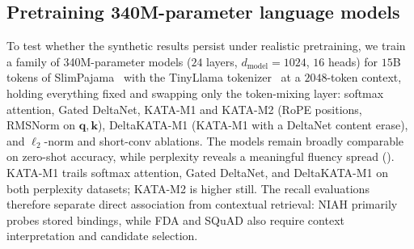 \documentclass{article}
\newcommand{\1}{\bm{1}}
\def\vk{{\bm{k}}}
\def\vq{{\bm{q}}}
\theoremstyle{definition}
\begin{document}
\subsection{Pretraining 340M-parameter language models}
\label{ssec:llm-pretraining}

To test whether the synthetic results persist under realistic pretraining, we train a family of
340M-parameter models
($24$ layers, $d_\text{model}{=}1024$, $16$ heads) for $15$B tokens of
SlimPajama~\citep{soboleva23slimpajama} with the TinyLlama tokenizer~\citep{zhang24tinyllama} at a
$2048$-token context, holding everything fixed and swapping only the token-mixing layer: softmax
attention, Gated DeltaNet, KATA-M1 and KATA-M2 (RoPE positions, RMSNorm on $\vq,\vk$),
DeltaKATA-M1 (KATA-M1 with a DeltaNet content erase), and $\ell_2$-norm and short-conv
ablations. The models remain broadly comparable on zero-shot accuracy, while perplexity reveals a meaningful
fluency spread (). KATA-M1 trails softmax attention, Gated DeltaNet, and
DeltaKATA-M1 on both perplexity datasets; KATA-M2 is higher still. The recall evaluations therefore
separate direct association from contextual retrieval: NIAH primarily probes stored bindings,
while FDA and SQuAD also require context interpretation and candidate selection.
\end{document}
